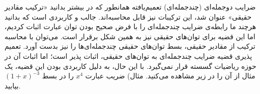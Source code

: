 \begin{EXTRA}{ضرایب دوجمله‌ای (چندجمله‌ای) تعمیم‌یافته}
\p
همانطور که در بیشتر بدانید «ترکیب مقادیر حقیقی» عنوان شد، این ترکیبات نیز قابل محاسبه‌اند.
جالب و کاربردی است که بدانید هرچند ما رابطه‌ی ضرایب چندجمله‌ای را با فرض صحیح
بودن توان عبارت اثبات کردیم، اما این قضیه برای توان‌های حقیقی نیز به همین شکل برقرار است.
می‌توان با محاسبه ترکیب از مقادیر حقیقی، بسط توان‌های حقیقی چندجمله‌ای‌ها را نیز بدست آورد.
تعمیم پذیری قضیه ضرایب چندجمله‌ای به توان‌های حقیقی، اثبات پذیر است؛ اما اثبات آن در حوزه ریاضیات گسسته قرار نمی‌گیرد.
با این حال، به دلیل کاربردی بودن این قضیه، یک مثال از آن را در زیر مشاهده می‌کنید.
\p
مثال)
ضریب عبارت
$x^4$
را در بسط
$(1+x)^{-3}$
بیابید.
\end{EXTRA}